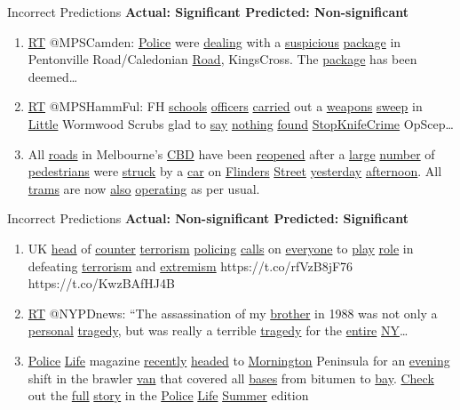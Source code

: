 \documentclass[12pt]{beamer}
\begin{document}
\begin{frame}{Incorrect Predictions}
    \textbf{Actual: Significant \hfill Predicted: Non-significant}
    \begin{enumerate}
        \item \underline{RT} @MPSCamden: \underline{Police} were \underline{dealing} with a \underline{suspicious} \underline{package} in Pentonville Road/Caledonian \underline{Road}, KingsCross. The \underline{package} has been deemed…
        \item \underline{RT} @MPSHammFul: FH \underline{schools} \underline{officers} \underline{carried} out a \underline{weapons} \underline{sweep} in \underline{Little} Wormwood Scrubs glad to \underline{say} \underline{nothing} \underline{found} \underline{StopKnifeCrime} OpScep…
        \item All \underline{roads} in Melbourne's \underline{CBD} have been \underline{reopened} after a \underline{large} \underline{number} of \underline{pedestrians} were \underline{struck} by a \underline{car} on \underline{Flinders} \underline{Street} \underline{yesterday} \underline{afternoon}. All \underline{trams} are now \underline{also} \underline{operating} as per usual.
    \end{enumerate}
\end{frame}

\begin{frame}{Incorrect Predictions}
    \textbf{Actual: Non-significant \hfill Predicted: Significant}
    \begin{enumerate}
        \item UK \underline{head} of \underline{counter} \underline{terrorism} \underline{policing} \underline{calls} on \underline{everyone} to \underline{play} \underline{role} in defeating \underline{terrorism} and \underline{extremism} https://t.co/rfVzB8jF76 https://t.co/KwzBAfHJ4B
        \item \underline{RT} @NYPDnews: “The assassination of my \underline{brother} in 1988 was not only a \underline{personal} \underline{tragedy}, but was really a terrible \underline{tragedy} for the \underline{entire} \underline{NY}…
        \item \underline{Police} \underline{Life} magazine \underline{recently} \underline{headed} to \underline{Mornington} Peninsula for an \underline{evening} shift in the brawler \underline{van} that covered all \underline{bases} from bitumen to \underline{bay}. \underline{Check} out the \underline{full} \underline{story} in the \underline{Police} \underline{Life} \underline{Summer} edition
    \end{enumerate}
\end{frame}
\end{document}
